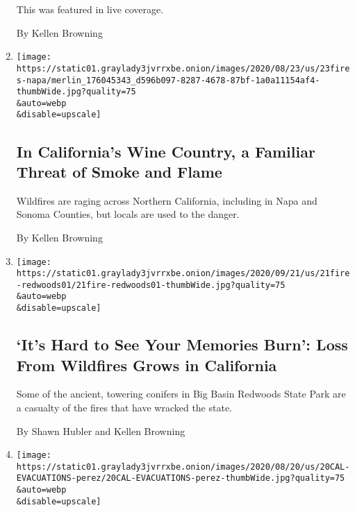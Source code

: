 \begin{enumerate}
  This was featured in live coverage.

  By Kellen Browning
\item
  \href{/2020/08/23/us/california-fires-wine-country-napa-valley.html}{}

  \texttt{[image: https://static01.graylady3jvrrxbe.onion/images/2020/08/23/us/23fires-napa/merlin\_176045343\_d596b097-8287-4678-87bf-1a0a11154af4-thumbWide.jpg?quality=75\\\&auto=webp\\\&disable=upscale]}

  \hypertarget{in-californias-wine-country-a-familiar-threat-of-smoke-and-flame}{%
  \subsection{In California's Wine Country, a Familiar Threat of Smoke
  and
  Flame}\label{in-californias-wine-country-a-familiar-threat-of-smoke-and-flame}}

  Wildfires are raging across Northern California, including in Napa and
  Sonoma Counties, but locals are used to the danger.

  By Kellen Browning
\item
  \href{/2020/08/21/us/big-basin-redwoods-ca-fires.html}{}

  \texttt{[image: https://static01.graylady3jvrrxbe.onion/images/2020/09/21/us/21fire-redwoods01/21fire-redwoods01-thumbWide.jpg?quality=75\\\&auto=webp\\\&disable=upscale]}

  \hypertarget{its-hard-to-see-your-memories-burn-loss-from-wildfires-grows-in-california}{%
  \subsection{`It's Hard to See Your Memories Burn': Loss From Wildfires
  Grows in
  California}\label{its-hard-to-see-your-memories-burn-loss-from-wildfires-grows-in-california}}

  Some of the ancient, towering conifers in Big Basin Redwoods State
  Park are a casualty of the fires that have wracked the state.

  By Shawn Hubler and Kellen Browning
\item
  \href{/2020/08/20/us/ca-wildfires-covid.html}{}

  \texttt{[image: https://static01.graylady3jvrrxbe.onion/images/2020/08/20/us/20CAL-EVACUATIONS-perez/20CAL-EVACUATIONS-perez-thumbWide.jpg?quality=75\\\&auto=webp\\\&disable=upscale]}

  \hypertarget{as-wildfires-rage-californians-fear-the-virus-at-shelters}{%
}
\end{enumerate}
